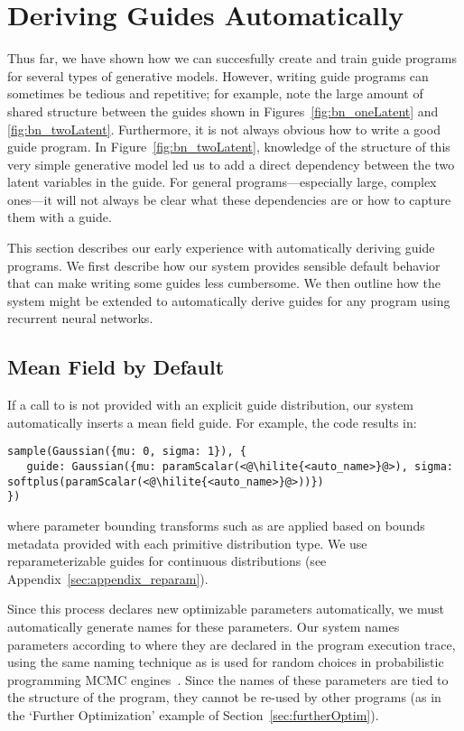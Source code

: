 \section{Deriving Guides Automatically}
\label{sec:autoGuide}

Thus far, we have shown how we can succesfully create and train guide programs for several types of generative models. However, writing guide programs can sometimes be tedious and repetitive; for example, note the large amount of shared structure between the guides shown in Figures~\ref{fig:bn_oneLatent} and \ref{fig:bn_twoLatent}. Furthermore, it is not always obvious how to write a good guide program. In Figure~\ref{fig:bn_twoLatent}, knowledge of the structure of this very simple generative model led us to add a direct dependency between the two latent variables in the guide. For general programs---especially large, complex ones---it will not always be clear what these dependencies are or how to capture them with a guide.

This section describes our early experience with automatically deriving guide programs. We first describe how our system provides sensible default behavior that can make writing some guides less cumbersome. We then outline how the system might be extended to automatically derive guides for any program using recurrent neural networks.

\subsection{Mean Field by Default}
\label{sec:autoGuide:meanField}

If a call to  is not provided with an explicit guide distribution, our system automatically inserts a mean field guide. For example, the code  results in:
\begin{lstlisting}
sample(Gaussian({mu: 0, sigma: 1}), {
   guide: Gaussian({mu: paramScalar(<@\hilite{<auto_name>}@>), sigma: softplus(paramScalar(<@\hilite{<auto_name>}@>))})
})
\end{lstlisting}
where parameter bounding transforms such as  are applied based on bounds metadata provided with each primitive distribution type. We use reparameterizable guides for continuous distributions (see Appendix~\ref{sec:appendix_reparam}).

Since this process declares new optimizable parameters automatically, we must automatically generate names for these parameters. Our system names parameters according to where they are declared in the program execution trace, using the same naming technique as is used for random choices in probabilistic programming MCMC engines~\cite{Lightweight}. Since the names of these parameters are tied to the structure of the program, they cannot be re-used by other programs (as in the `Further Optimization' example of Section~\ref{sec:furtherOptim}).

